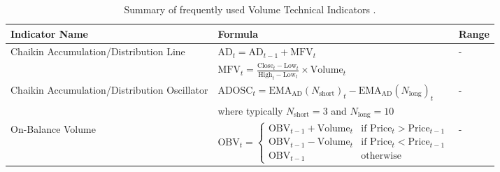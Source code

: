 \begin{table}[htb!]
\caption{Summary of frequently used Volume Technical Indicators \cite{jansen_machine_2020}.}
\label{Tables:VolumeIndicators}
\centering
\footnotesize
\begin{tabularx}{\textwidth}{@{}lXl@{}}
\toprule
\textbf{Indicator Name} & \textbf{Formula} & \textbf{Range} \\ 
\midrule
Chaikin Accumulation/Distribution Line & $\text{AD}_t = \text{AD}_{t-1} + \text{MFV}_t$ & - \\
\addlinespace
& $\text{MFV}_t = \frac{\text{Close}_t - \text{Low}_t}{\text{High}_t - \text{Low}_t} \times \text{Volume}_t$ & \\
\addlinespace
Chaikin Accumulation/Distribution Oscillator & $\text{ADOSC}_t = \text{EMA}_\text{AD}(N_{\text{short}})_t - \text{EMA}_\text{AD}(N_{\text{long}})_t$ & - \\
\addlinespace
& where typically $N_{\text{short}} = 3$ and $N_{\text{long}} = 10$ & \\
\addlinespace
On-Balance Volume & $\text{OBV}_t = 
\begin{cases} 
\text{OBV}_{t-1} + \text{Volume}_t & \text{if } \text{Price}_t > \text{Price}_{t-1} \\
\text{OBV}_{t-1} - \text{Volume}_t & \text{if } \text{Price}_t < \text{Price}_{t-1} \\
\text{OBV}_{t-1} & \text{otherwise}
\end{cases}$ & - \\
\bottomrule
\end{tabularx}
\end{table}
